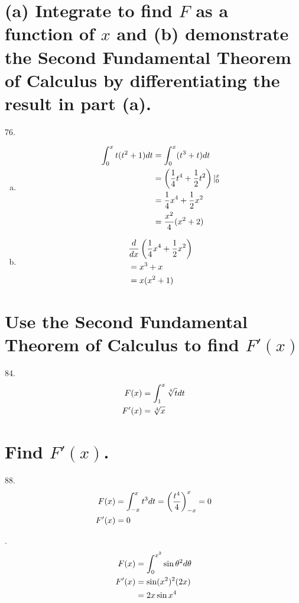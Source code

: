 \documentclass[11pt]{article}
\newcommand*{\vs}{\vspace{1cm}}
\newcommand*{\next}{\noindent}
\newcommand*{\set}{\setcounter{equation}{0}}
\newcommand*{\lt}{\left}
\newcommand*{\rt}{\right}
\begin{document}
\section{(a) Integrate to find $F$ as a function of $x$ and
(b) demonstrate the Second Fundamental Theorem of Calculus
by differentiating the result in part (a).}
76.\begin{enumerate}[(a)]
    \item
        \begin{align}
            \set
            \int_{0}^{x}t(t^2+1)dt&=\int_{0}^{x}(t^3+t)dt\\
            &=\lt(\frac{1}{4}t^4+\frac{1}{2}t^2\rt)|_0^x\\
            &=\frac{1}{4}x^4+\frac{1}{2}x^2\\
            &=\frac{x^2}{4}(x^2+2)   
        \end{align}
    \item
        \begin{align}
            \set
            &\frac{d}{dx}\lt(\frac{1}{4}x^4+\frac{1}{2}x^2\rt)\\
            &=x^3+x\\
            &=x(x^2+1)
        \end{align}
\end{enumerate}

\section{Use the Second Fundamental Theorem of
Calculus to find $F'(x)$}
84.\begin{align}
    \set
    F(x)&=\int_{1}^{x}\sqrt[4]{t}dt\\
    F'(x)&=\sqrt[4]{x}
\end{align}

\section{Find $F'(x)$.}
88.\begin{align}
    \set
    F(x)&=\int_{-x}^{x}t^3dt=\lt(\frac{t^4}{4}\rt)_{-x}^x=0\\
    F'(x)&=0
\end{align}

\vs\next
92.\begin{align}
    \set
    F(x)&=\int_{0}^{x^2}\sin\theta^2 d\theta\\
    F'(x)&=\sin(x^2)^2(2x)\\
    &=2x\sin x^4
\end{align}
\end{document}
